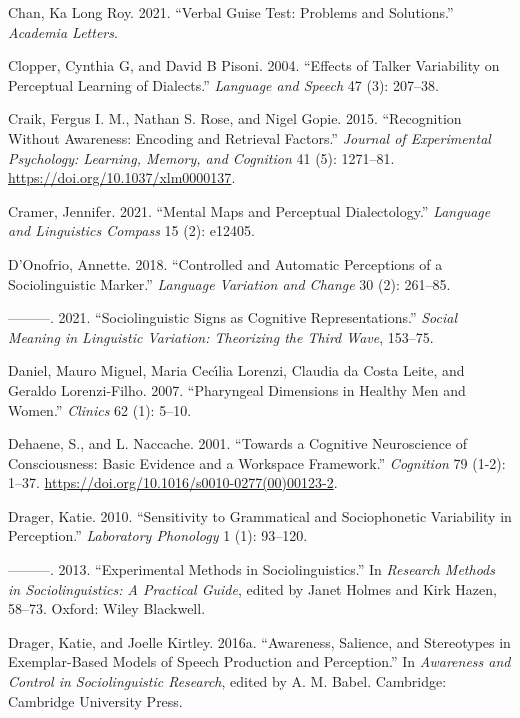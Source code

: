\documentclass[
  letterpaper,
  DIV=11,
  numbers=noendperiod]{scrartcl}
\newlength{\cslhangindent}
\newenvironment{CSLReferences}[2] %
 {\begin{list}{}{%
  \setlength{\itemindent}{0pt}
  \setlength{\leftmargin}{0pt}
  \setlength{\parsep}{0pt}
  \ifodd #1
   \setlength{\leftmargin}{\cslhangindent}
   \setlength{\itemindent}{-1\cslhangindent}
  \fi
  \setlength{\itemsep}{#2\baselineskip}}}
 {\end{list}}
\begin{document}
\begin{CSLReferences}{1}{0}
Chan, Ka Long Roy. 2021. {``Verbal Guise Test: Problems and
Solutions.''} \emph{Academia Letters}.

Clopper, Cynthia G, and David B Pisoni. 2004. {``Effects of Talker
Variability on Perceptual Learning of Dialects.''} \emph{Language and
Speech} 47 (3): 207--38.

Craik, Fergus I. M., Nathan S. Rose, and Nigel Gopie. 2015.
{``Recognition Without Awareness: {Encoding} and Retrieval Factors.''}
\emph{Journal of Experimental Psychology: Learning, Memory, and
Cognition} 41 (5): 1271--81. \url{https://doi.org/10.1037/xlm0000137}.

Cramer, Jennifer. 2021. {``Mental Maps and Perceptual Dialectology.''}
\emph{Language and Linguistics Compass} 15 (2): e12405.

D'Onofrio, Annette. 2018. {``Controlled and Automatic Perceptions of a
Sociolinguistic Marker.''} \emph{Language Variation and Change} 30 (2):
261--85.

---------. 2021. {``Sociolinguistic Signs as Cognitive
Representations.''} \emph{Social Meaning in Linguistic Variation:
Theorizing the Third Wave}, 153--75.

Daniel, Mauro Miguel, Maria Cecı́lia Lorenzi, Claudia da Costa Leite, and
Geraldo Lorenzi-Filho. 2007. {``Pharyngeal Dimensions in Healthy Men and
Women.''} \emph{Clinics} 62 (1): 5--10.

Dehaene, S., and L. Naccache. 2001. {``Towards a Cognitive Neuroscience
of Consciousness: Basic Evidence and a Workspace Framework.''}
\emph{Cognition} 79 (1-2): 1--37.
\url{https://doi.org/10.1016/s0010-0277(00)00123-2}.

Drager, Katie. 2010. {``Sensitivity to Grammatical and Sociophonetic
Variability in Perception.''} \emph{Laboratory Phonology} 1 (1):
93--120.

---------. 2013. {``Experimental Methods in Sociolinguistics.''} In
\emph{Research Methods in Sociolinguistics: A Practical Guide}, edited
by Janet Holmes and Kirk Hazen, 58--73. Oxford: Wiley Blackwell.

Drager, Katie, and Joelle Kirtley. 2016a. {``Awareness, Salience, and
Stereotypes in Exemplar-Based Models of Speech Production and
Perception.''} In \emph{Awareness and Control in Sociolinguistic
Research}, edited by A. M. Babel. Cambridge: Cambridge University Press.


\end{CSLReferences}
\end{document}
